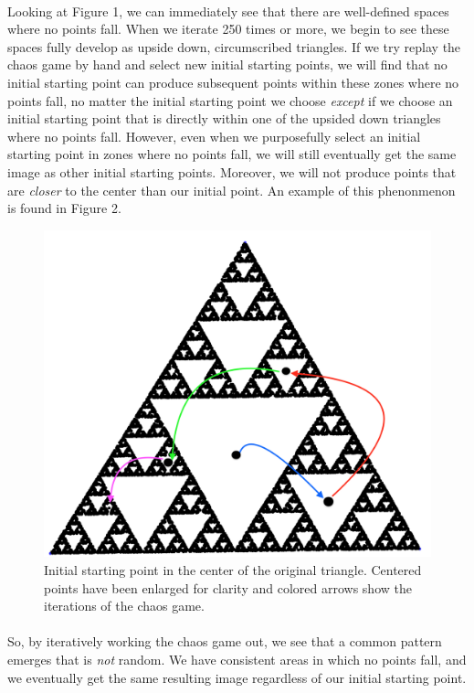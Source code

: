 \documentclass{article}
\begin{document}
\paragraph{}
Looking at Figure 1, we can immediately see that there are well-defined spaces where no points fall. When we iterate 250 times or more, we begin to see these spaces fully develop as upside down, circumscribed triangles. If we try replay the chaos game by hand and select new initial starting points, we will find that no initial starting point can produce subsequent points within these zones where no points fall, no matter the initial starting point we choose \textit{except} if we choose an initial starting point that is directly within one of the upsided down triangles where no points fall. However, even when we purposefully select an initial starting point in zones where no points fall, we will still eventually get the same image as other initial starting points. Moreover, we will not produce points that are \textit{closer} to the center than our initial point. An example of this phenonmenon is found in Figure 2.
\begin{figure}[H]
    \centering
    \includegraphics[width=.5\linewidth, height=.25\textheight]{centered_start}
    \caption{Initial starting point in the center of the original triangle. Centered points have been enlarged for clarity and colored arrows show the iterations of the chaos game.}
\end{figure}

\paragraph{}
 So, by iteratively working the chaos game out, we see that a common pattern emerges that is \textit{not} random. We have consistent areas in which no points fall, and we eventually get the same resulting image regardless of our initial starting point.
\end{document}
